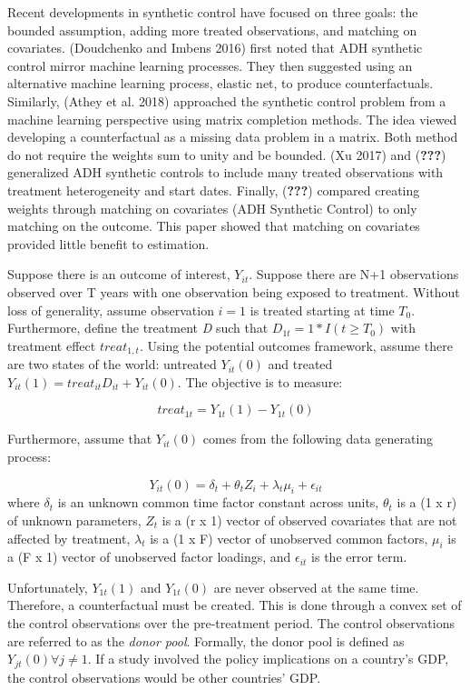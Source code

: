 \documentclass[
]{article}
\begin{document}
Recent developments in synthetic control have focused on three goals:
the bounded assumption, adding more treated observations, and matching
on covariates. (Doudchenko and Imbens 2016) first noted that ADH
synthetic control mirror machine learning processes. They then suggested
using an alternative machine learning process, elastic net, to produce
counterfactuals. Similarly, (Athey et al. 2018) approached the synthetic
control problem from a machine learning perspective using matrix
completion methods. The idea viewed developing a counterfactual as a
missing data problem in a matrix. Both method do not require the weights
sum to unity and be bounded. (Xu 2017) and ({\textbf{???}}) generalized
ADH synthetic controls to include many treated observations with
treatment heterogeneity and start dates. Finally, ({\textbf{???}})
compared creating weights through matching on covariates (ADH Synthetic
Control) to only matching on the outcome. This paper showed that
matching on covariates provided little benefit to estimation.

Suppose there is an outcome of interest, \(Y_{it}\). Suppose there are
N+1 observations observed over T years with one observation being
exposed to treatment. Without loss of generality, assume observation
\(i=1\) is treated starting at time \(T_0\). Furthermore, define the
treatment \emph{D} such that \(D_{1t}=1*I(t \ge T_0)\) with treatment
effect \(treat_{1,t}\). Using the potential outcomes framework, assume
there are two states of the world: untreated \(Y_{it}(0)\) and treated
\(Y_{it}(1)=treat_{it} D_{it}+Y_{it}(0)\). The objective is to measure:

\[treat_{1t}=Y_{1t}(1)-Y_{1t}(0)\]

Furthermore, assume that \(Y_{it}(0)\) comes from the following data
generating process:

\[Y_{it}(0)=\delta_t+\theta_t Z_i +\lambda_t \mu_i+\epsilon_{it}\] where
\(\delta_t\) is an unknown common time factor constant across units,
\(\theta_t\) is a (1 x r) of unknown parameters, \(Z_t\) is a (r x 1)
vector of observed covariates that are not affected by treatment,
\(\lambda_t\) is a (1 x F) vector of unobserved common factors,
\(\mu_i\) is a (F x 1) vector of unobserved factor loadings, and
\(\epsilon_{it}\) is the error term.

Unfortunately, \(Y_{1t}(1)\) and \(Y_{1t}(0)\) are never observed at the
same time. Therefore, a counterfactual must be created. This is done
through a convex set of the control observations over the pre-treatment
period. The control observations are referred to as the \emph{donor
pool}. Formally, the donor pool is defined as
\(Y_{jt}(0) \forall j \ne 1\). If a study involved the policy
implications on a country's GDP, the control observations would be other
countries' GDP.
\end{document}
